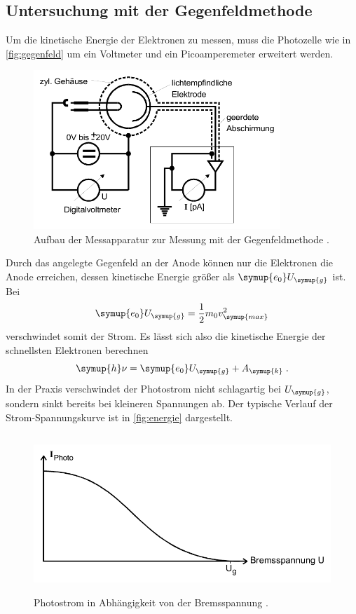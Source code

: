 \subsection{Untersuchung mit der Gegenfeldmethode}
Um die kinetische Energie der Elektronen zu messen, muss die Photozelle wie in \autoref{fig:gegenfeld} 
um ein Voltmeter und ein Picoamperemeter erweitert werden.
\begin{figure}
    \centering
    \includegraphics[height = 6cm]{gegenfeld.pdf}
    \caption{Aufbau der Messapparatur zur Messung mit der Gegenfeldmethode \cite{ap500}.}
    \label{fig:gegenfeld}
\end{figure}
Durch das angelegte Gegenfeld an der Anode
können nur die Elektronen die Anode erreichen, dessen kinetische Energie größer als $\symup{e_0}U_{\symup{g}}$
ist. Bei 
\begin{equation*}
    \symup{e_0}U_{\symup{g}} = \frac{1}{2} m_0 v_{\symup{max}}^2
\end{equation*}
verschwindet somit der Strom. Es lässt sich also die kinetische Energie der schnellsten Elektronen 
berechnen
\begin{equation}
    \symup{h} \nu = \symup{e_0}U_{\symup{g}}  + A_{\symup{k}} \; .
    \label{eqn:nu}
\end{equation}
In der Praxis verschwindet der Photostrom nicht schlagartig bei $U_{\symup{g}}$, sondern sinkt bereits 
bei kleineren Spannungen ab. Der typische Verlauf der Strom-Spannungskurve ist in \autoref{fig:energie}
dargestellt. 
\begin{figure}
    \centering
    \includegraphics[height = 6cm]{energie.pdf}
    \caption{Photostrom in Abhängigkeit von der Bremsspannung \cite{ap500}.}
    \label{fig:energie}
\end{figure}

